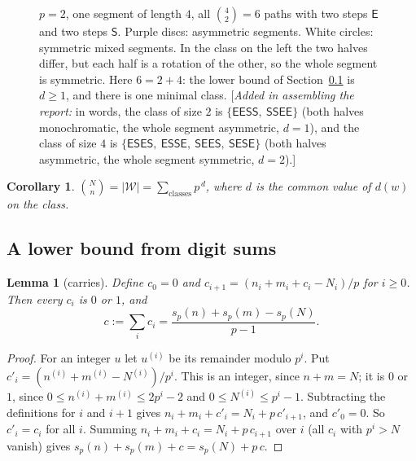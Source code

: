 \documentclass[11pt]{article}
\newtheorem{lemma}[theorem]{Lemma}
\newtheorem{corollary}[theorem]{Corollary}
\theoremstyle{definition}
\theoremstyle{remark}
\numberwithin{equation}{section}
\numberwithin{figure}{section}
\newcommand{\E}{\textsf{E}}
\newcommand{\Ss}{\textsf{S}}
\newcommand{\W}{\mathcal{W}}
\newcommand{\assembler}[1]{[\emph{Added in assembling the report:} #1]}
\begin{document}
\begin{figure}[ht]
\caption{$p=2$, one segment of length $4$, all $\binom42=6$ paths with two steps $\E$ and two steps $\Ss$.
Purple discs: asymmetric segments. White circles: symmetric mixed segments. In the class on the left the two halves
differ, but each half is a rotation of the other, so the whole segment is symmetric.
Here $6=2+4$: the lower bound of Section~\ref{path:sec:bound} is $d\ge1$, and there is one minimal class. \assembler{in words, the class of size $2$ is $\{\E\E\Ss\Ss,\ \Ss\Ss\E\E\}$ (both halves monochromatic, the
whole segment asymmetric, $d=1$), and the class of size $4$ is
$\{\E\Ss\E\Ss,\ \E\Ss\Ss\E,\ \Ss\E\E\Ss,\ \Ss\E\Ss\E\}$ (both halves asymmetric, the whole segment symmetric,
$d=2$).}}
\label{path:fig:classes}
\end{figure}

\begin{corollary}\label{path:cor:sum}
$\displaystyle\binom Nn=|\W|=\sum_{\text{classes}}p^{\,d}$, where $d$ is the common value of $d(w)$ on the class.
\end{corollary}

\subsection{A lower bound from digit sums}\label{path:sec:bound}

\begin{lemma}[carries]\label{path:lem:carries}
Define $c_0=0$ and $c_{i+1}=(n_i+m_i+c_i-N_i)/p$ for $i\ge 0$. Then every $c_i$ is $0$ or $1$, and
\[
c:=\sum_i c_i=\frac{s_p(n)+s_p(m)-s_p(N)}{p-1}.
\]
\end{lemma}
\begin{proof}
For an integer $u$ let $u^{(i)}$ be its remainder modulo $p^i$. Put $c'_i=(n^{(i)}+m^{(i)}-N^{(i)})/p^i$. This is an
integer, since $n+m=N$; it is $0$ or $1$, since $0\le n^{(i)}+m^{(i)}\le 2p^i-2$ and $0\le N^{(i)}\le p^i-1$.
Subtracting the definitions for $i$ and $i+1$ gives $n_i+m_i+c'_i=N_i+p\,c'_{i+1}$, and $c'_0=0$. So $c'_i=c_i$ for
all $i$. Summing $n_i+m_i+c_i=N_i+p\,c_{i+1}$ over $i$
(all $c_i$ with $p^i>N$ vanish) gives $s_p(n)+s_p(m)+c=s_p(N)+p\,c$.
\end{proof}
\end{document}
